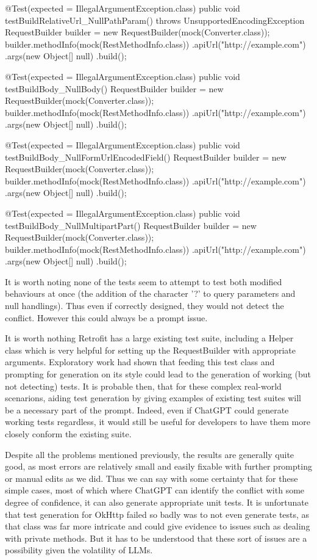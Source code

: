 \begin{response}
@Test(expected = IllegalArgumentException.class)
public void testBuildRelativeUrl_NullPathParam() throws UnsupportedEncodingException {
    RequestBuilder builder = new RequestBuilder(mock(Converter.class));
    builder.methodInfo(mock(RestMethodInfo.class))
           .apiUrl("http://example.com")
           .args(new Object[] {null})
           .build();
}

@Test(expected = IllegalArgumentException.class)
public void testBuildBody_NullBody() {
    RequestBuilder builder = new RequestBuilder(mock(Converter.class));
    builder.methodInfo(mock(RestMethodInfo.class))
           .apiUrl("http://example.com")
           .args(new Object[] {null})
           .build();
}

@Test(expected = IllegalArgumentException.class)
public void testBuildBody_NullFormUrlEncodedField() {
    RequestBuilder builder = new RequestBuilder(mock(Converter.class));
    builder.methodInfo(mock(RestMethodInfo.class))
           .apiUrl("http://example.com")
           .args(new Object[] {null})
           .build();
}

@Test(expected = IllegalArgumentException.class)
public void testBuildBody_NullMultipartPart() {
    RequestBuilder builder = new RequestBuilder(mock(Converter.class));
    builder.methodInfo(mock(RestMethodInfo.class))
           .apiUrl("http://example.com")
           .args(new Object[] {null})
           .build();
}
\end{response}
It is worth noting none of the tests seem to attempt to test both modified behaviours at once (the addition of the character '?' to query parameters and null handlings). Thus even if correctly designed, they would not detect the conflict.
However this could always be a prompt issue.

It is worth nothing Retrofit has a large existing test suite, including a Helper class which is very helpful for setting up the RequestBuilder with appropriate arguments.
Exploratory work had shown that feeding this test class and prompting for generation on its style could lead to the generation of working (but not detecting) tests. It is probable then,
that for these complex real-world scenarions, aiding test generation by giving examples of existing test suites will be a necessary part of the prompt. Indeed, even if ChatGPT could generate
working tests regardless, it would still be useful for developers to have them more closely conform the existing suite.

Despite all the problems mentioned previously, the results are generally quite good, as most errors are relatively small and easily fixable with further prompting or manual edits as we did.
Thus we can say with some certainty that for these simple cases, most of which where ChatGPT can identify the conflict with some degree of confidence, it can also generate appropriate unit tests.
It is unfortunate that test generation for OkHttp failed so badly was to not even generate tests, as that class was far more intricate and could give evidence to issues such as dealing with
private methods. But it has to be understood that these sort of issues are a possibility given the volatility of LLMs.



